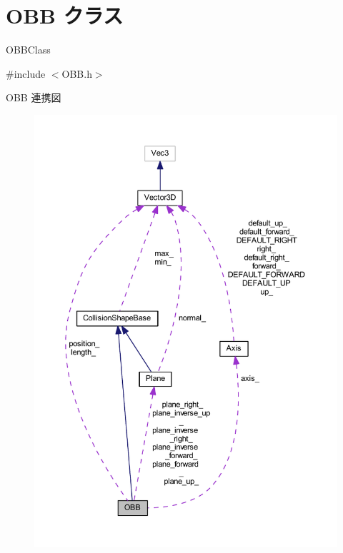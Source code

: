 \hypertarget{class_o_b_b}{}\section{O\+BB クラス}
\label{class_o_b_b}


O\+B\+B\+Class  




{\ttfamily \#include $<$O\+B\+B.\+h$>$}



O\+BB 連携図\nopagebreak
\begin{figure}[H]
\begin{center}
\leavevmode
\includegraphics[width=350pt]{class_o_b_b__coll__graph}
\end{center}
\end{figure}
